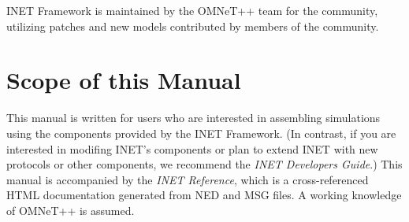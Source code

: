 INET Framework is maintained by the OMNeT++ team for the community, 
utilizing patches and new models contributed by members of the community.

\section{Scope of this Manual}

This manual is written for users who are interested in assembling
simulations using the components provided by the INET Framework.
(In contrast, if you are interested in modifing INET's components or plan to 
extend INET with new protocols or other components, we recommend the 
\textit{INET Developers Guide}.)
This manual is accompanied by the \textit{INET Reference}, which is 
a cross-referenced HTML documentation generated from NED and MSG files. 
A working knowledge of OMNeT++ is assumed.



